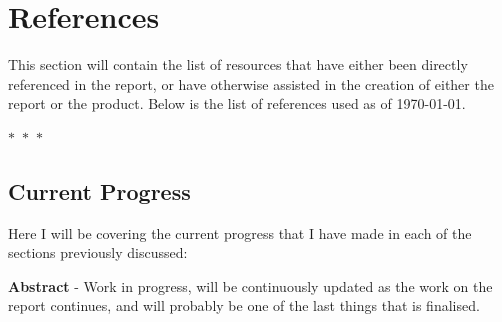 \documentclass[abstract=on,12pt]{scrreprt}
\begin{document}
	

	

	

	

	

	\nocite{*}	%
	\begingroup
		\chapter{References}
		\label{ref}
		This section will contain the list of resources that have either been directly referenced in the report, or have otherwise assisted in the creation of either the report or the product. Below is the list of references used as of \today.

		\begin{center}
			$\ast$~$\ast$~$\ast$
		\end{center}

		\renewcommand{\chapter}[2]{}		%
	\endgroup

	

	\chapter*{Summary of Progress}
	\label{summary}
	
		\section*{Current Progress}
			Here I will be covering the current progress that I have made in each of the sections previously discussed:
	
			\textbf{Abstract} - Work in progress, will be continuously updated as the work on the report continues, and will probably be one of the last things that is finalised.
	
\end{document}
